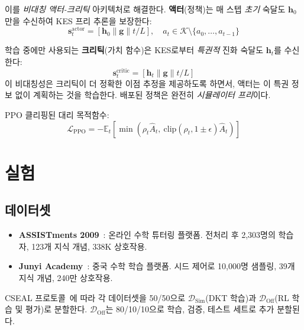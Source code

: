 \documentclass[11pt,a4paper]{article}
\newcommand{\ppo}{\mathrm{PPO}}
\newcommand{\E}{\mathbb{E}}
\begin{document}
이를 \emph{비대칭 액터-크리틱} 아키텍처로 해결한다. \textbf{액터}(정책)는 매 스텝 \emph{초기} 숙달도 $\mathbf{h}_0$만을 수신하여 KES 프리 추론을 보장한다:
\begin{equation}
    \mathbf{s}_t^{\text{actor}} = [\mathbf{h}_0 \| \mathbf{g} \| t/L], \quad a_t \in \mathcal{K} \setminus \{a_0, \ldots, a_{t-1}\}
\end{equation}

학습 중에만 사용되는 \textbf{크리틱}(가치 함수)은 KES로부터 \emph{특권적} 진화 숙달도 $\mathbf{h}_t$를 수신한다:
\begin{equation}
    \mathbf{s}_t^{\text{critic}} = [\mathbf{h}_t \| \mathbf{g} \| t/L]
\end{equation}
이 비대칭성은 크리틱이 더 정확한 이점 추정을 제공하도록 하면서, 액터는 이 특권 정보 없이 계획하는 것을 학습한다. 배포된 정책은 완전히 \emph{시뮬레이터 프리}이다.

PPO 클리핑된 대리 목적함수:
\begin{equation}
    \mathcal{L}_{\ppo} = -\E_t\left[\min\left(\rho_t \hat{A}_t,\ \text{clip}(\rho_t, 1\pm\epsilon) \hat{A}_t\right)\right]
\end{equation}

\section{실험}

\subsection{데이터셋}

\begin{itemize}
    \item \textbf{ASSISTments 2009}~\cite{feng2009assistments}: 온라인 수학 튜터링 플랫폼. 전처리 후 2,303명의 학습자, 123개 지식 개념, 338K 상호작용.
    \item \textbf{Junyi Academy}~\cite{chang2015junyi}: 중국 수학 학습 플랫폼. 시드 제어로 10,000명 샘플링, 39개 지식 개념, 240만 상호작용.
\end{itemize}

CSEAL 프로토콜~\cite{liu2019cseal}에 따라 각 데이터셋을 50/50으로 $\mathcal{D}_{\text{Sim}}$(DKT 학습)과 $\mathcal{D}_{\text{Off}}$(RL 학습 및 평가)로 분할한다. $\mathcal{D}_{\text{Off}}$는 80/10/10으로 학습, 검증, 테스트 세트로 추가 분할된다.
\end{document}
